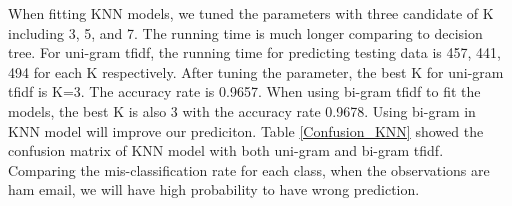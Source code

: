 
When fitting KNN models, we tuned the parameters with three candidate of K including 3, 5, and 7. The running time is much longer comparing to decision tree. For uni-gram tfidf, the running time for predicting testing data is 457, 441, 494 for each K respectively. After tuning the parameter, the best K for uni-gram tfidf is K=3. The accuracy rate is 0.9657. When using bi-gram tfidf to fit the models, the best K is also 3 with the accuracy rate 0.9678. Using bi-gram in KNN model will improve our prediciton. Table \ref{Confusion_KNN} showed the confusion matrix of KNN model with both uni-gram and bi-gram tfidf. Comparing the mis-classification rate for each class, when the observations are ham email, we will have high probability to have wrong prediction.\\

